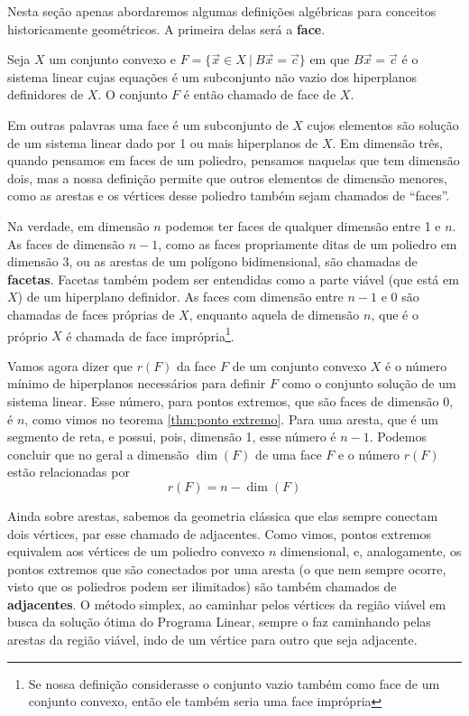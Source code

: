 Nesta seção apenas abordaremos algumas definições algébricas para conceitos historicamente geométricos. A primeira delas será a \textbf{face}.

\begin{def:face}
	Seja $X$ um conjunto convexo e $F = \{\vec{x} \in X\ |\ B\vec{x} = \vec{c}\}$ em que $B\vec{x} = \vec{c}$ é o sistema linear cujas equações é um subconjunto não vazio dos hiperplanos definidores de $X$. O conjunto $F$ é então chamado de face de $X$. 
\end{def:face}

Em outras palavras uma face é um subconjunto de $X$ cujos elementos são solução de um sistema linear dado por 1 ou mais hiperplanos de $X$. Em dimensão três, quando pensamos em faces de um poliedro, pensamos naquelas que tem dimensão dois, mas a nossa definição permite que outros elementos de dimensão menores, como as arestas e os vértices desse poliedro também sejam chamados de ``faces''. 

Na verdade, em dimensão $n$ podemos ter faces de qualquer dimensão entre 1 e $n$. As faces de dimensão $n - 1$, como as faces propriamente ditas de um poliedro em dimensão 3, ou as arestas de um polígono bidimensional, são chamadas de \textbf{facetas}. Facetas também podem ser entendidas como a parte viável (que está em $X$) de um hiperplano definidor.  As faces com dimensão entre $n - 1$ e $0$ são chamadas de faces próprias de $X$, enquanto aquela de dimensão $n$, que é o próprio $X$ é chamada de face imprópria\footnote{Se nossa definição considerasse o conjunto vazio também como face de um conjunto convexo, então ele também seria uma face imprópria}.

Vamos agora dizer que $r(F)$ da face $F$ de um conjunto convexo $X$ é o número mínimo de hiperplanos necessários para definir $F$ como o conjunto solução de um sistema linear. Esse número, para pontos extremos, que são faces de dimensão 0, é $n$, como vimos no teorema \ref{thm:ponto extremo}. Para uma aresta, que é um segmento de reta, e possui, pois, dimensão 1, esse número é $n - 1$. Podemos concluir que no geral a dimensão $\dim(F)$ de uma face $F$ e o número $r(F)$ estão relacionadas por
\begin{equation*}
	r(F)= n - \dim(F)
\end{equation*} 

Ainda sobre arestas, sabemos da geometria clássica que elas sempre conectam dois vértices, par esse chamado de adjacentes. Como vimos, pontos extremos equivalem aos vértices de um poliedro convexo $n$ dimensional, e, analogamente, os pontos extremos que são conectados por uma aresta (o que nem sempre ocorre, visto que os poliedros podem ser ilimitados) são também chamados de \textbf{adjacentes}. O método simplex, ao caminhar pelos vértices da região viável em busca da solução ótima do Programa Linear, sempre o faz caminhando pelas arestas da região viável, indo de um vértice para outro que seja adjacente.

